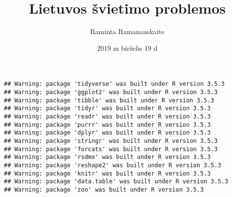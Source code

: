 \documentclass[]{article}
\title{Lietuvos švietimo problemos}
\author{Raminta Ramanauskaite}
\date{2019 m birželis 19 d}
\begin{document}
\maketitle

\begin{verbatim}
## Warning: package 'tidyverse' was built under R version 3.5.3
## Warning: package 'ggplot2' was built under R version 3.5.3
## Warning: package 'tibble' was built under R version 3.5.3
## Warning: package 'tidyr' was built under R version 3.5.3
## Warning: package 'readr' was built under R version 3.5.3
## Warning: package 'purrr' was built under R version 3.5.3
## Warning: package 'dplyr' was built under R version 3.5.3
## Warning: package 'stringr' was built under R version 3.5.3
## Warning: package 'forcats' was built under R version 3.5.3
## Warning: package 'rsdmx' was built under R version 3.5.3
## Warning: package 'reshape2' was built under R version 3.5.3
## Warning: package 'knitr' was built under R version 3.5.3
## Warning: package 'data.table' was built under R version 3.5.3
## Warning: package 'zoo' was built under R version 3.5.3
\end{verbatim}
\end{document}
